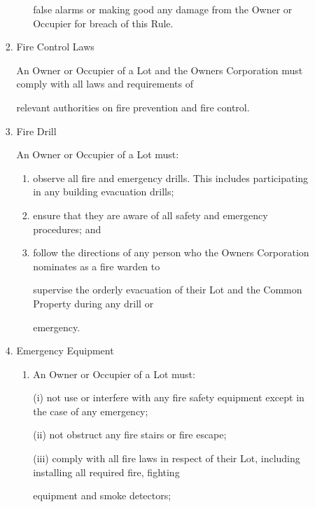 \documentclass{article}
\begin{document}
\begin{enumerate}[label=\arabic*.]
\begin{enumerate}[label=\arabic{enumi}.\arabic*.]
\begin{enumerate}[label=(\arabic*)]
\begin{enumerate}[label=(\alph*)]
{\fontsize{10.02}{1}false alarms or making good any damage from the Owner or Occupier for breach of this Rule. }

\end{enumerate}
\item {\fontsize{9.962}{1} Fire Control Laws }

{\fontsize{10.02}{1}An Owner or Occupier of a Lot and the Owners Corporation must comply with all laws and requirements of }

{\fontsize{10.02}{1}relevant authorities on fire prevention and fire control. }

\item {\fontsize{9.962}{1} Fire Drill }

{\fontsize{10.02}{1}An Owner or Occupier of a Lot must: }

\begin{enumerate}[label=(\alph*)]
\item {\fontsize{9.962}{1} observe all fire and emergency drills. This includes participating in any building evacuation drills; }

\item {\fontsize{9.962}{1} ensure that they are aware of all safety and emergency procedures; and }

\item {\fontsize{9.962}{1} follow the directions of any person who the Owners Corporation nominates as a fire warden to }

{\fontsize{10.02}{1}supervise the orderly evacuation of their Lot and the Common Property during any drill or }

{\fontsize{10.02}{1}emergency. }

\end{enumerate}
\item {\fontsize{9.962}{1} Emergency Equipment }

\begin{enumerate}[label=(\alph*)]
\item {\fontsize{9.962}{1} An Owner or Occupier of a Lot must: }

{\fontsize{9.962}{1}(i) not use or interfere with any fire safety equipment except in the case of any emergency; }

{\fontsize{9.962}{1}(ii) not obstruct any fire stairs or fire escape; }

{\fontsize{9.962}{1}(iii) comply with all fire laws in respect of their Lot, including installing all required fire, fighting }

{\fontsize{10.02}{1}equipment and smoke detectors; }


\end{enumerate}
\end{enumerate}
\end{enumerate}
\end{enumerate}
\end{document}
